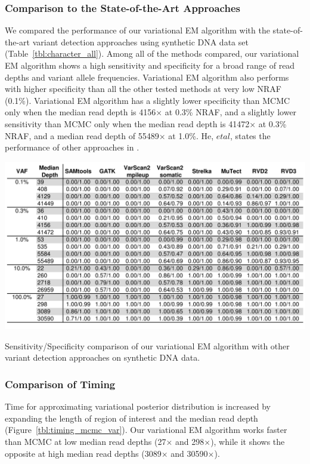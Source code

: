 \documentclass[11pt,reqno]{amsart}
\begin{document}
\subsubsection{Comparison to the State-of-the-Art Approaches}
We compared the performance of our variational EM algorithm with the state-of-the-art variant detection approaches using synthetic DNA data set (Table~\ref{tbl:character_all}).
Among all of the methods compared, our variational EM algorithm shows a high sensitivity and specificity for a broad range of read depths and variant allele frequencies.
Variational EM algorithm also performs with higher specificity than all the other tested methods at very low NRAF (0.1\%).
Variational EM algorithm has a slightly lower specificity than MCMC only when the median read depth is 4156$\times$ at 0.3\% NRAF, and a slightly lower sensitivity than MCMC only when the median read depth is 41472$\times$ at 0.3\% NRAF, and a median read depth of 55489$\times$ at 1.0\%.
He, $\mathit{et} \mathit{al}$, states the performance of other approaches in \citep{he2015rvd2}.

\begin{table}[htbp]
\centering
\includegraphics[width=1.0\textwidth]{tables/character_all.png}
\caption{Sensitivity/Specificity comparison of our variational EM algorithm with other variant detection approaches on synthetic DNA data.}
\vspace{-5pt}
\label{tbl:character_all}
\end{table}

\subsubsection{Comparison of Timing}
Time for approximating variational posterior distribution is increased by expanding the length of region of interest and the median read depth (Figure~\ref{tbl:timing_mcmc_var}).
Our variational EM algorithm works faster than MCMC at low median read depths (27$\times$ and 298$\times$), while it shows the opposite at high median read depths (3089$\times$ and 30590$\times$).
\end{document}
